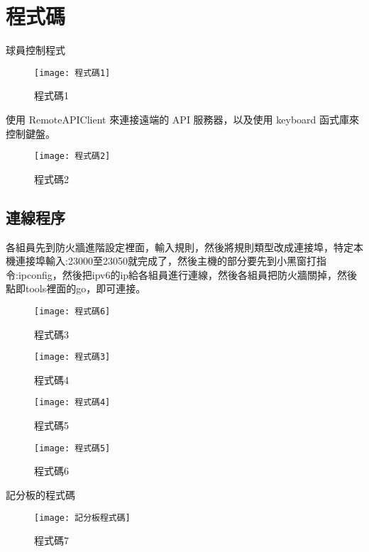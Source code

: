 \chapter{程式碼}
 球員控制程式\\
 
 \begin{figure}[hbt!]
\begin{center}
\texttt{[image: 程式碼1]}
\caption{\Large 程式碼1}\label{fig.程式碼1}
\end{center}
\end{figure}

 使用 RemoteAPIClient 來連接遠端的 API 服務器，以及使用
keyboard 函式庫來控制鍵盤。\\
\begin{figure}[hbt!]
\begin{center}
\texttt{[image: 程式碼2]}
\caption{\Large 程式碼2}\label{fig.程式碼2}
\end{center}
\end{figure}
\newpage
 
\section{連線程序}
各組員先到防火牆進階設定裡面，輸入規則，然後將規則類型改成連接埠，特定本機連接埠輸入:23000至23050就完成了，然後主機的部分要先到小黑窗打指令:ipconfig，然後把ipv6的ip給各組員進行連線，然後各組員把防火牆關掉，然後點即tools裡面的go，即可連接。\\
\begin{figure}[hbt!]
\begin{center}
\texttt{[image: 程式碼6]}
\caption{\Large 程式碼3}\label{fig.程式碼6}
\end{center}
\end{figure}

\begin{figure}[hbt!]
\begin{center}
\texttt{[image: 程式碼3]}
\caption{\Large 程式碼4}\label{fig.程式碼3}
\end{center}
\end{figure}
\newpage

\begin{figure}[hbt!]
\begin{center}
\texttt{[image: 程式碼4]}
\caption{\Large 程式碼5}\label{fig.程式碼4}
\end{center}
\end{figure}

\begin{figure}[hbt!]
\begin{center}
\texttt{[image: 程式碼5]}
\caption{\Large 程式碼6}\label{fig.程式碼5}
\end{center}
\end{figure}

記分板的程式碼\\
\begin{figure}[hbt!]
\begin{center}
\texttt{[image: 記分板程式碼]}
\caption{\Large 程式碼7}\label{fig.記分板程式碼}
\end{center}
\end{figure}
\newpage